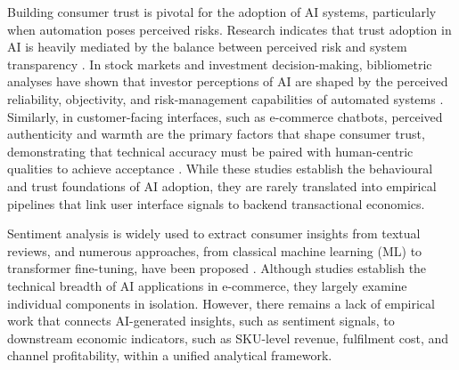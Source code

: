 \documentclass[authoryear,review,3p,times,12pt]{elsarticle}
\begin{document}
Building consumer trust is pivotal for the adoption of AI systems, particularly when automation poses perceived risks. Research indicates that trust adoption in AI is heavily mediated by the balance between perceived risk and system transparency \citep{phan2025ai_trust}. In stock markets and investment decision-making, bibliometric analyses have shown that investor perceptions of AI are shaped by the perceived reliability, objectivity, and risk-management capabilities of automated systems \citep{phan2026mind}. Similarly, in customer-facing interfaces, such as e-commerce chatbots, perceived authenticity and warmth are the primary factors that shape consumer trust, demonstrating that technical accuracy must be paired with human-centric qualities to achieve acceptance \citep{phan2025ai_heart}. While these studies establish the behavioural and trust foundations of AI adoption, they are rarely translated into empirical pipelines that link user interface signals to backend transactional economics.

Sentiment analysis is widely used to extract consumer insights from textual reviews, and numerous approaches, from classical machine learning (ML) to transformer fine-tuning, have been proposed \cite{liu2020sentiment, bellar12152403, DAZA2024100267}. Although studies \citep{bawack2022artificial, liu2020sentiment, bellar12152403, DAZA2024100267} establish the technical breadth of AI applications in e-commerce, they largely examine individual components in isolation. However, there remains a lack of empirical work that connects AI-generated insights, such as sentiment signals, to downstream economic indicators, such as SKU-level revenue, fulfilment cost, and channel profitability, within a unified analytical framework.
\end{document}
